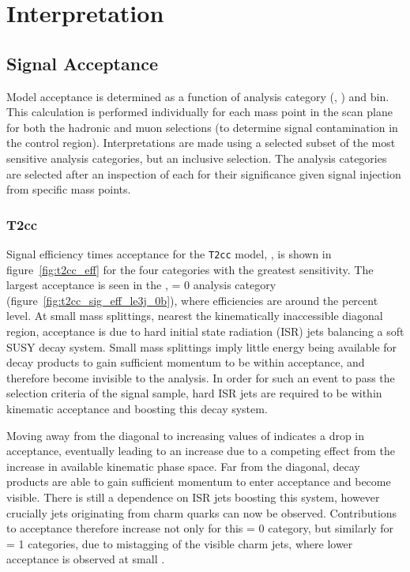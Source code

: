 \chapter{Interpretation}
\label{ch:interpretation}

\ifpdf
    \graphicspath{{Chapter9/Figs/Raster/}{Chapter9/Figs/PDF/}{Chapter9/Figs/}}
\else
    \graphicspath{{Chapter9/Figs/Vector/}{Chapter9/Figs/}}
\fi

\section{Signal Acceptance}  %
\label{sec:interpretation_acceptance}

Model acceptance is determined as a function of analysis category (\nb, \nj) and
\HT bin. This calculation is performed individually for each mass point in the
scan plane for both the hadronic and muon selections (to determine 
signal contamination in the control region). Interpretations are made using a
selected subset of the most sensitive analysis 
categories, but an inclusive \HT selection. The analysis categories are 
selected after an inspection of each for their significance given signal 
injection from specific mass points.

\subsection{T2cc}
\label{sec:t2cc_eff}
Signal efficiency times acceptance for the \texttt{T2cc} model, \Ttwocc,  is shown in 
figure~\ref{fig:t2cc_eff} for the four categories with the greatest sensitivity.
The largest acceptance is seen in the \njlow, 
\nb= 0 analysis category (figure~\ref{fig:t2cc_sig_eff_le3j_0b}), where efficiencies
are around the percent level. At 
small mass splittings, nearest the kinematically inaccessible diagonal region, 
acceptance is due to hard initial state radiation (ISR) jets balancing a soft 
SUSY decay system. Small mass splittings imply little energy being available for
decay products to gain sufficient momentum to be within acceptance, and therefore 
become invisible to the analysis. In order for such an event to pass the 
selection criteria of the signal sample, hard ISR jets are required to be within
kinematic acceptance and boosting this decay system.

Moving away from the 
diagonal to increasing values of \deltam indicates a drop in acceptance, 
eventually leading to an increase due to a competing effect from the increase in
available kinematic phase space. Far from the diagonal, decay products are able 
to gain sufficient momentum to enter acceptance and become visible. There
is still a dependence on ISR jets boosting this system, however crucially jets 
originating from charm quarks can now be observed. Contributions to acceptance
therefore increase not only for this \nb= 0 category, but similarly for \nb= 1
categories, due to mistagging of the visible charm jets, where lower
acceptance is observed at small \deltam.

